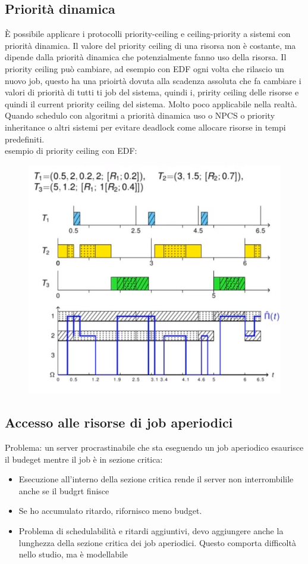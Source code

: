 \documentclass[12pt, oneside]{extbook}
\begin{document}
\subsection{Priorità dinamica}
È possibile applicare i protocolli priority-ceiling e ceiling-priority a sistemi con priorità dinamica. Il valore del priority ceiling di una risorsa non è costante, ma dipende dalla priorità dinamica che potenzialmente fanno uso della risorsa. Il priority ceiling può cambiare, ad esempio con EDF ogni volta che rilascio un nuovo job, questo ha una prioirtà dovuta alla scadenza assoluta che fa cambiare i valori di priorità di tutti ti job del sistema, quindi i, pririty ceiling delle risorse e quindi il current priority ceiling del sistema. Molto poco applicabile nella realtà. Quando schedulo con algoritmi a priorità dinamica uso o NPCS o priority inheritance o altri sistemi per evitare deadlock come allocare risorse in tempi predefiniti.\\ esempio di priority ceiling con EDF:\\
\begin{figure}[!h]
\centering
\includegraphics[scale=0.4]{immagini/image-034.jpg}
\end{figure}
\subsection{Accesso alle risorse di job aperiodici}
Problema: un server procrastinabile che sta eseguendo un job aperiodico esaurisce il budeget mentre il job è in sezione critica:
\begin{itemize}
\item Esecuzione all'interno della sezione critica rende il server non interrombilile anche se il budgrt finisce
\item Se ho accumulato ritardo, rifornisco meno budget.
\item Problema di schedulabilità e ritardi aggiuntivi, devo aggiungere anche la lunghezza della sezione critica dei job aperiodici. Questo comporta difficoltà nello studio, ma è modellabile
\end{itemize}
\end{document}
